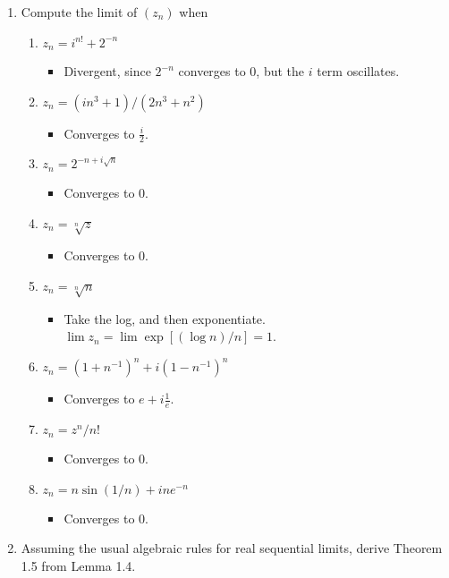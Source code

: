 \documentclass[12pt,a4paper]{article}
\begin{document}
\begin{enumerate}[label={\bfseries II.5.\arabic*}]
	\item Compute the limit of $(z_n)$ when
	\begin{enumerate}[label=(\roman*)]
		\item $z_n = i^{n!} + 2^{-n}$
			\begin{itemize}
				\item[] Divergent, since $2^{-n}$ converges to 0, but the $i$ term oscillates.
			\end{itemize}
		\item $z_n = (in^3 + 1)/(2n^3+n^2)$
			\begin{itemize}
				\item[] Converges to $\frac{i}{2}$.
			\end{itemize}
		\item $z_n = 2^{-n + i\sqrt{n}}$
			\begin{itemize}
				\item[] Converges to 0.
			\end{itemize}
		\item $z_n = \sqrt[n]{z}$
			\begin{itemize}
				\item[] Converges to 0.
			\end{itemize}
		\item $z_n = \sqrt[n]{n}$
			\begin{itemize}
				\item[] Take the log, and then exponentiate. $\lim z_n = \lim \exp [(\log n)/n]=1$. 
			\end{itemize}
		\item $z_n = (1+n^{-1})^n + i(1-n^{-1})^n$
			\begin{itemize}
				\item[] Converges to $e + i\frac{1}{e}$.
			\end{itemize}
		\item $z_n = z^n/n!$
			\begin{itemize}
				\item[] Converges to 0.
			\end{itemize}
		\item $z_n = n\sin(1/n) + ine^{-n}$
			\begin{itemize}
				\item[] Converges to 0.
			\end{itemize}
	\end{enumerate}

\item Assuming the usual algebraic rules for real sequential limits, derive Theorem 1.5 from Lemma 1.4.
\end{enumerate}
\end{document}
